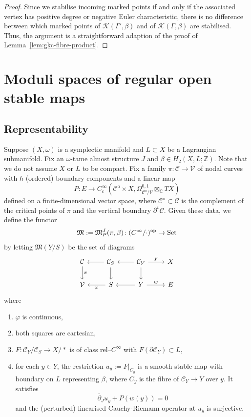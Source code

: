 \documentclass[11pt,psamsfonts, oneside, reqno]{amsart}
\newcommand{\sub}{\subset}%
\newcommand{\cl}{\colon}
\newcommand{\inn}{^\mathrm{o}}
\newcommand{\Set}{\normalfont\text{Set}}
\newcommand{\delbar}{\bar\partial}
\newcommand{\del}{\partial}
\newcommand{\bC}{\mathbb{C}}
\newcommand{\bZ}{\mathbb{Z}}
\newcommand{\cC}{\mathcal{C}}
\newcommand{\cK}{\mathcal{K}}
\newcommand{\cV}{\mathcal{V}}
\newcommand{\fM}{\mathfrak{M}}
\theoremstyle{definition}
\theoremstyle{remark}
\numberwithin{equation}{section}
\begin{document}
\begin{proof}
	Since we stabilise incoming marked points if and only if the associated vertex has positive degree or negative Euler characteristic, there is no difference between which marked points of $\cK(\Gamma',\beta)$ and of $\cK(\Gamma,\beta)$ are stabilised. Thus, the argument is a straightforward adaption of the proof of Lemma~\ref{lem:gkc-fibre-product}. 
\end{proof}



\appendix
\section{Moduli spaces of regular open stable maps}\label{sec:gluing}

\subsection{Representability} Suppose $(X,\omega)$ is a symplectic manifold and $L \sub X$ be a Lagrangian submanifold. Fix an $\omega$-tame almost structure $J$ and $\beta\in H_2(X,L;\bZ)$. Note that we do not assume $X$ or $L$ to be compact. Fix a family $\pi\cl \cC\to \cV$ of nodal curves with $h$ (ordered) boundary components and a linear map 
$$P \cl E\to C^\infty_c(\cC\inn\times X,\Omega^{0,1}_{\cC\inn/\cV}\boxtimes_\bC TX)$$
defined on a finite-dimensional vector space, where $\cC\inn \sub \cC$ is the complement of the critical points of $\pi$ and the vertical boundary $\del^v\cC$. Given these data, we define the functor 
$$\fM := \fM^J_P(\pi,\beta)\cl (C^\infty/\cdot)^{\text{op}}\to \Set$$
by letting $\fM(Y/S)$ be the set of diagrams
\begin{equation}\label{eq:functor-de}\begin{tikzcd}
		\cC\arrow[d,"\pi"] & \cC_S\arrow[d]\arrow[l] &\cC_Y\arrow[d]\arrow[l]\arrow[r,"F"] & X\\
		\cV& S\arrow[l,"\varphi"]&Y\arrow[l,]\arrow[r,"w"] & E\end{tikzcd} \end{equation}
where 
\begin{enumerate}[\normalfont i)]
	\item $\varphi$ is continuous,
	\item both squares are cartesian,
	\item $F\cl \cC_Y/\cC_S \to X/*$ is of class rel--$C^\infty$ with $F(\del \cC_Y) \sub L$,
	\item for each $y \in Y$, the restriction $u_y := F|_{C_y}$ is a smooth stable map with boundary on $L$ representing $\beta$, where $C_y$ is the fibre of $\cC_Y\to Y$ over $y$. It satisfies 
	\begin{equation}\label{eq:perturbed-pde-representability}\delbar_J u_y  + P(w(y)) = 0 \end{equation}
	and the (perturbed) linearised Cauchy-Riemann operator at $u_y$ is surjective.
\end{enumerate}
\end{document}
